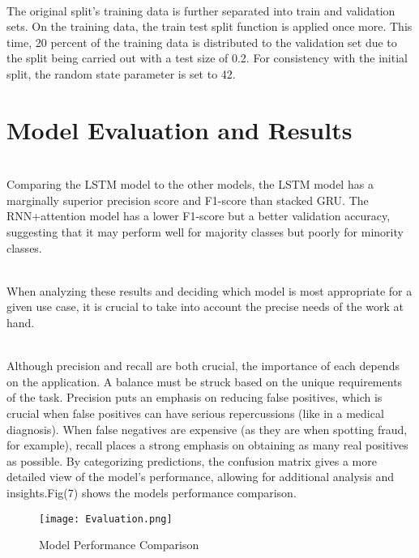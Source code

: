 \documentclass[conference]{IEEEtran}
\begin{document}
\\ The original split's training data is further separated into train and validation sets. On the training data, the train test split function is applied once more. This time, 20 percent of the training data is distributed to the validation set due to the split being carried out with a test size of 0.2. For consistency with the initial split, the random state parameter is set to 42.

\section{Model Evaluation and Results}
\\ Comparing the LSTM model to the other models, the LSTM model has a marginally superior precision score and F1-score than stacked GRU.
The RNN+attention model has a lower F1-score but a better validation accuracy, suggesting that it may perform well for majority classes but poorly for minority classes. 

\\ When analyzing these results and deciding which model is most appropriate for a given use case, it is crucial to take into account the precise needs of the work at hand.

\\ Although precision and recall are both crucial, the importance of each depends on the application. A balance must be struck based on the unique requirements of the task.
Precision puts an emphasis on reducing false positives, which is crucial when false positives can have serious repercussions (like in a medical diagnosis).
When false negatives are expensive (as they are when spotting fraud, for example), recall places a strong emphasis on obtaining as many real positives as possible.
By categorizing predictions, the confusion matrix gives a more detailed view of the model's performance, allowing for additional analysis and insights.Fig(7) shows the models performance comparison.
\begin{figure}[htbp]
\centerline{\texttt{[image: Evaluation.png]}}
\caption{Model Performance Comparison}
\label{fig}
\end{figure}

\\ 
\end{document}
